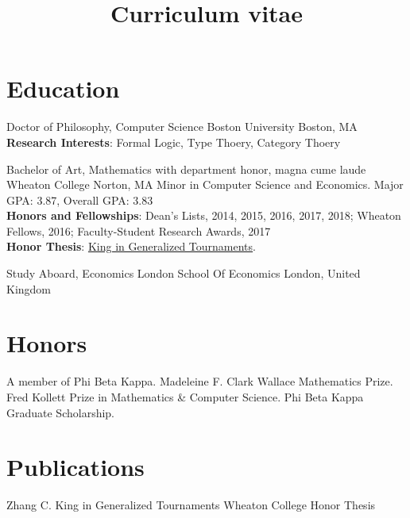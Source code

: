 \documentclass[11pt,a4paper,roman]{moderncv}        %
\title{Curriculum vitae}
\begin{document}

\makecvtitle{}

\setlength{\parskip}{2.5px}
\linespread{1.3}
\selectfont


\section{Education}

{Doctor of Philosophy, Computer Science} {}
{Boston University}
{Boston, MA}
{\textbf{Research Interests}: Formal Logic, Type Thoery, Category Thoery}  %

{Bachelor of Art, Mathematics} {with department honor, magna cume laude}
{Wheaton College}
{Norton, MA}
{Minor in Computer Science and Economics.
Major GPA\@: 3.87, Overall GPA\@: 3.83\\
\textbf{Honors and Fellowships}: Dean's Lists, 2014, 2015, 2016, 2017, 2018;
Wheaton Fellows, 2016;
Faculty-Student Research Awards, 2017\\
\textbf{Honor Thesis}: \href{http://hdl.handle.net/11040/24570}{King in Generalized Tournaments}.
}

{Study Aboard, Economics} {}
{London School Of Economics}
{London, United Kingdom}
{}  %




\section{Honors}
 {A member of Phi Beta Kappa.}
 {
  Madeleine F. Clark Wallace Mathematics Prize. \newline
  Fred Kollett Prize in Mathematics \& Computer Science. \newline
  Phi Beta Kappa Graduate Scholarship.
}



\section{Publications}

{Zhang C.}
{King in Generalized Tournaments}
{Wheaton College Honor Thesis}
{}{}
\end{document}
